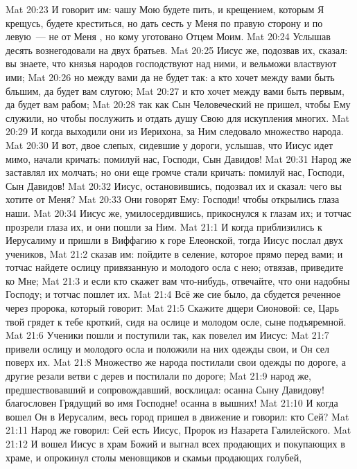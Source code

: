 \vs Mat 20:23 И говорит им: чашу Мою будете пить, и крещением, которым Я крещусь, будете креститься, но дать сесть у Меня по правую сторону и по левую~--- не от Меня , но кому уготовано Отцем Моим.
\vs Mat 20:24 Услышав  десять  вознегодовали на двух братьев.
\vs Mat 20:25 Иисус же, подозвав их, сказал: вы знаете, что князья народов господствуют над ними, и вельможи властвуют ими;
\vs Mat 20:26 но между вами да не будет так: а кто хочет между вами быть бльшим, да будет вам слугою;
\vs Mat 20:27 и кто хочет между вами быть первым, да будет вам рабом;
\vs Mat 20:28 так как Сын Человеческий не  пришел, чтобы Ему служили, но чтобы послужить и отдать душу Свою для искупления многих.
\rsbpar\vs Mat 20:29 И когда выходили они из Иерихона, за Ним следовало множество народа.
\vs Mat 20:30 И вот, двое слепых, сидевшие у дороги, услышав, что Иисус идет мимо, начали кричать: помилуй нас, Господи, Сын Давидов!
\vs Mat 20:31 Народ же заставлял их молчать; но они еще громче стали кричать: помилуй нас, Господи, Сын Давидов!
\vs Mat 20:32 Иисус, остановившись, подозвал их и сказал: чего вы хотите от Меня?
\vs Mat 20:33 Они говорят Ему: Господи! чтобы открылись глаза наши.
\vs Mat 20:34 Иисус же, умилосердившись, прикоснулся к глазам их; и тотчас прозрели глаза их, и они пошли за Ним.
\vs Mat 21:1 И когда приблизились к Иерусалиму и пришли в Виффагию к горе Елеонской, тогда Иисус послал двух учеников,
\vs Mat 21:2 сказав им: пойдите в селение, которое прямо перед вами; и тотчас найдете ослицу привязанную и молодого осла с нею; отвязав, приведите ко Мне;
\vs Mat 21:3 и если кто скажет вам что-нибудь, отвечайте, что они надобны Господу; и тотчас пошлет их.
\vs Mat 21:4 Всё же сие было, да сбудется реченное через пророка, который говорит:
\vs Mat 21:5 Скажите дщери Сионовой: се, Царь твой грядет к тебе кроткий, сидя на ослице и молодом осле, сыне подъяремной.
\vs Mat 21:6 Ученики пошли и поступили так, как повелел им Иисус:
\vs Mat 21:7 привели ослицу и молодого осла и положили на них одежды свои, и Он сел поверх их.
\vs Mat 21:8 Множество же народа постилали свои одежды по дороге, а другие резали ветви с дерев и постилали по дороге;
\vs Mat 21:9 народ же, предшествовавший и сопровождавший, восклицал: осанна Сыну Давидову! благословен Грядущий во имя Господне! осанна в вышних!
\vs Mat 21:10 И когда вошел Он в Иерусалим, весь город пришел в движение и говорил: кто Сей?
\vs Mat 21:11 Народ же говорил: Сей есть Иисус, Пророк из Назарета Галилейского.
\rsbpar\vs Mat 21:12 И вошел Иисус в храм Божий и выгнал всех продающих и покупающих в храме, и опрокинул столы меновщиков и скамьи продающих голубей,
